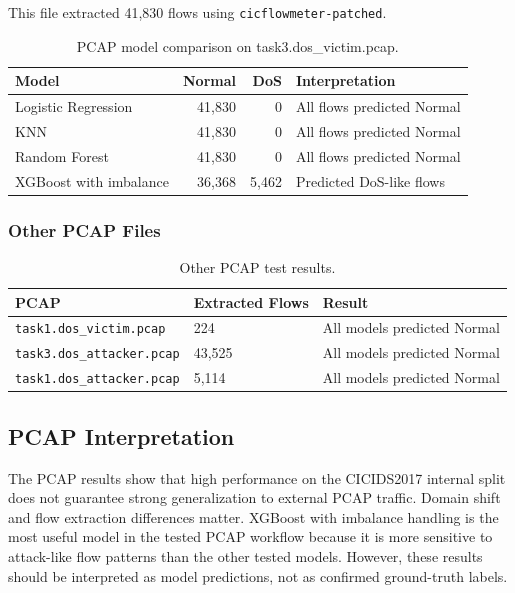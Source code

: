\documentclass[12pt,a4paper]{article}
\begin{document}
This file extracted 41,830 flows using \texttt{cicflowmeter-patched}.

\begin{longtable}{l r r l}
\caption{PCAP model comparison on task3.dos\_victim.pcap.}\\
\toprule
\textbf{Model} & \textbf{Normal} & \textbf{DoS} & \textbf{Interpretation} \\
\midrule
Logistic Regression & 41,830 & 0 & All flows predicted Normal \\
KNN & 41,830 & 0 & All flows predicted Normal \\
Random Forest & 41,830 & 0 & All flows predicted Normal \\
XGBoost with imbalance & 36,368 & 5,462 & Predicted DoS-like flows \\
\bottomrule
\end{longtable}

\subsubsection{Other PCAP Files}

\begin{longtable}{l l l}
\caption{Other PCAP test results.}\\
\toprule
\textbf{PCAP} & \textbf{Extracted Flows} & \textbf{Result} \\
\midrule
\texttt{task1.dos\_victim.pcap} & 224 & All models predicted Normal \\
\texttt{task3.dos\_attacker.pcap} & 43,525 & All models predicted Normal \\
\texttt{task1.dos\_attacker.pcap} & 5,114 & All models predicted Normal \\
\bottomrule
\end{longtable}

\subsection{PCAP Interpretation}

The PCAP results show that high performance on the CICIDS2017 internal split does not guarantee strong generalization to external PCAP traffic. Domain shift and flow extraction differences matter. XGBoost with imbalance handling is the most useful model in the tested PCAP workflow because it is more sensitive to attack-like flow patterns than the other tested models. However, these results should be interpreted as model predictions, not as confirmed ground-truth labels.
\end{document}
